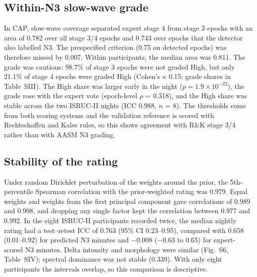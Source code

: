 \subsection{Within-N3 slow-wave grade}
In CAP, slow-wave coverage separated expert stage 4 from stage 3 epochs with an area of 0.782 over all stage 3/4 epochs and 0.743 over epochs that the detector also labelled N3. The prespecified criterion (0.75 on detected epochs) was therefore missed by 0.007. Within participants, the median area was 0.811. The grade was cautious: 98.7\% of stage 3 epochs were not graded High, but only 21.1\% of stage 4 epochs were graded High (Cohen's $\kappa$ 0.15; grade shares in Table~SIII). The High share was larger early in the night ($p = 1.9\times10^{-22}$), the grade rose with the expert vote (epoch-level $\rho$ = 0.318), and the High share was stable across the two ISRUC-II nights (ICC 0.988, $n$ = 8). The thresholds come from both scoring systems and the validation reference is scored with Rechtschaffen and Kales rules, so this shows agreement with R\&K stage 3/4 rather than with AASM N3 grading. %


\subsection{Stability of the rating}
Under random Dirichlet perturbation of the weights around the prior, the 5th-percentile Spearman correlation with the prior-weighted rating was 0.979. Equal weights and weights from the first principal component gave correlations of 0.989 and 0.998, and dropping any single factor kept the correlation between 0.977 and 0.992. In the eight ISRUC-II participants recorded twice, the median nightly rating had a test--retest ICC of 0.763 (95\% CI 0.23--0.95), compared with 0.658 (0.01--0.92) for predicted N3 minutes and $-$0.008 ($-$0.63 to 0.65) for expert-scored N3 minutes. Delta intensity and morphology were similar (Fig.~S6, Table~SIV); spectral dominance was not stable (0.339). With only eight participants the intervals overlap, so this comparison is descriptive. %

